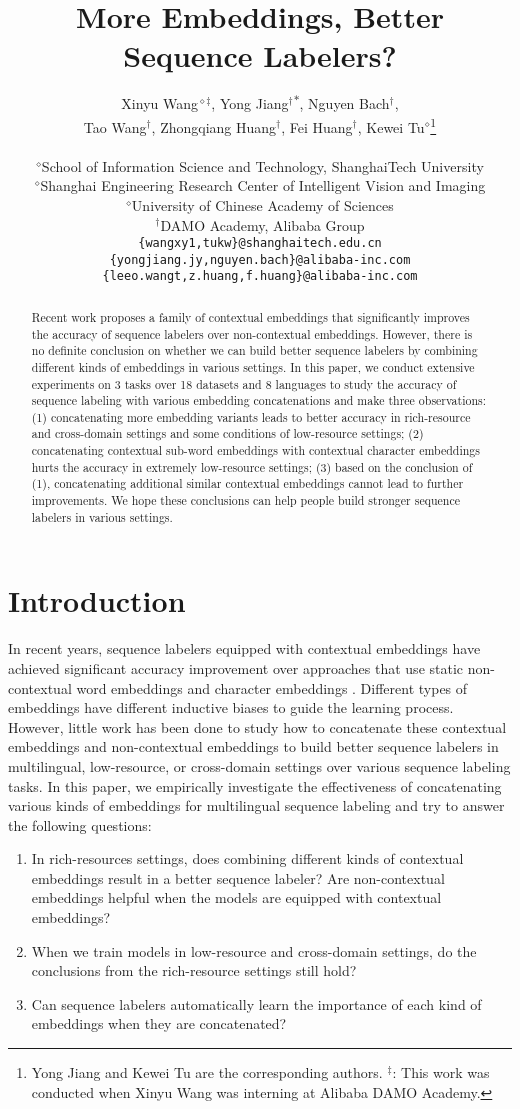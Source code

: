 \documentclass[11pt,a4paper]{article}
\title{More Embeddings, Better Sequence Labelers?}
\author{\parbox{\linewidth}{\centering Xinyu Wang$^{\diamond\ddagger}$, Yong Jiang$^{\dagger}$\textsuperscript{$\ast$}, Nguyen Bach$^{\dagger}$, \\ Tao Wang$^{\dagger}$, Zhongqiang Huang$^{\dagger}$, Fei Huang$^{\dagger}$,  Kewei Tu$^{\diamond}$\thanks{\hspace{1mm} Yong Jiang and Kewei Tu are the corresponding authors. $^{\ddagger}$: This work was conducted when Xinyu Wang was interning at Alibaba DAMO Academy.}} \\
 $^\diamond$School of Information Science and Technology, ShanghaiTech University \\
 $^{\diamond}$Shanghai Engineering Research Center of Intelligent Vision and Imaging \\
$^{\diamond}$University of Chinese Academy of Sciences \\
 $^\dagger$DAMO Academy, Alibaba Group \\
  {\tt \{wangxy1,tukw\}@shanghaitech.edu.cn} \\
  {\tt \{yongjiang.jy,nguyen.bach\}@alibaba-inc.com} \\
  {\tt \{leeo.wangt,z.huang,f.huang\}@alibaba-inc.com} \\
 }
\date{}
\begin{document}
\maketitle
\begin{abstract}
Recent work proposes a family of contextual embeddings that significantly improves the accuracy of sequence labelers over non-contextual embeddings. However, there is no definite conclusion on whether we can build better sequence labelers by combining different kinds of embeddings in various settings. 
In this paper, we conduct extensive experiments on 3 tasks over 18 datasets and 8 languages to study the accuracy of sequence labeling with various embedding concatenations and make three observations: (1) concatenating more embedding variants leads to better accuracy in rich-resource and cross-domain settings and some conditions of low-resource settings; (2) concatenating contextual sub-word embeddings with contextual character embeddings hurts the accuracy in extremely low-resource settings; (3) based on the conclusion of (1), concatenating additional similar contextual embeddings cannot lead to further improvements. We hope these conclusions can help people build stronger sequence labelers in various settings.


\end{abstract}


\section{Introduction}
\label{sec:introduction}
In recent years, sequence labelers equipped with contextual embeddings have achieved significant accuracy improvement \cite{peters-etal-2018-deep,akbik-etal-2018-contextual,devlin-etal-2019-bert,martin2019camembert} over approaches that use static non-contextual word embeddings \cite{mikolov2013distributed} and character embeddings \cite{santos2014learning}.
Different types of embeddings have different inductive biases to guide the learning process. However, little work has been done to study how to concatenate these contextual embeddings and non-contextual embeddings to build better sequence labelers in multilingual, low-resource, or cross-domain settings over various sequence labeling tasks. In this paper, we empirically investigate the effectiveness of concatenating various kinds of embeddings for multilingual sequence labeling and try to answer the following questions:
\begin{enumerate}
    \item In rich-resources settings, does combining different kinds of contextual embeddings result in a better sequence labeler? Are non-contextual embeddings helpful when the models are equipped with contextual embeddings?
    \item When we train models in low-resource and cross-domain settings, do the conclusions from the rich-resource settings still hold? 
    \item Can sequence labelers automatically learn the importance of each kind of embeddings when they are concatenated?
\end{enumerate}
\end{document}
